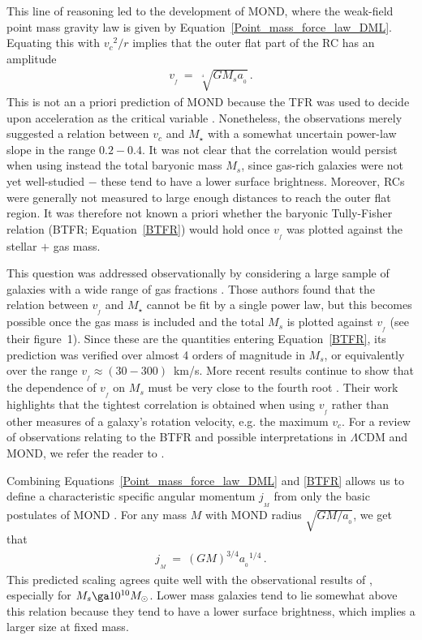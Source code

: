 \documentclass[fleqn,usenatbib,useAMS,onecolumn]{mnras} %
\begin{document}
This line of reasoning led to the development of MOND, where the weak-field point mass gravity law is given by Equation~\ref{Point_mass_force_law_DML}. Equating this with ${v_c}^2/r$ implies that the outer flat part of the RC has an amplitude
\begin{eqnarray}
	v_{_f} ~=~ \sqrt[^4]{GM_sa_{_0}} \, .
	\label{BTFR}
\end{eqnarray}
This is not an a priori prediction of MOND because the TFR was used to decide upon acceleration as the critical variable \citep{Sanders_2010, Sanders_2015}. Nonetheless, the observations merely suggested a relation between $v_c$ and $M_{\star}$ with a somewhat uncertain power-law slope in the range $0.2-0.4$. It was not clear that the correlation would persist when using instead the total baryonic mass $M_s$, since gas-rich galaxies were not yet well-studied $-$ these tend to have a lower surface brightness. Moreover, RCs were generally not measured to large enough distances to reach the outer flat region. It was therefore not known a priori whether the baryonic Tully-Fisher relation (BTFR; Equation~\ref{BTFR}) would hold once $v_{_f}$ was plotted against the stellar $+$ gas mass.

This question was addressed observationally by considering a large sample of galaxies with a wide range of gas fractions \citep{McGaugh_2000}. Those authors found that the relation between $v_{_f}$ and $M_{\star}$ cannot be fit by a single power law, but this becomes possible once the gas mass is included and the total $M_s$ is plotted against $v_{_f}$ (see their figure~1). Since these are the quantities entering Equation~\ref{BTFR}, its prediction was verified over almost 4 orders of magnitude in $M_s$, or equivalently over the range $v_{_f} \approx \left( 30 - 300 \right)$~km/s. More recent results continue to show that the dependence of $v_{_f}$ on $M_s$ must be very close to the fourth root \citep{Lelli_2019}. Their work highlights that the tightest correlation is obtained when using $v_{_f}$ rather than other measures of a galaxy's rotation velocity, e.g. the maximum $v_c$. For a review of observations relating to the BTFR and possible interpretations in $\Lambda$CDM and MOND, we refer the reader to \citet{McGaugh_2020}.

Combining Equations~\ref{Point_mass_force_law_DML} and \ref{BTFR} allows us to define a characteristic specific angular momentum $j_{_M}$ from only the basic postulates of MOND \citep{Milgrom_2021}. For any mass $M$ with MOND radius $\sqrt{GM/a_{_0}}$, we get that
\begin{eqnarray}
    j_{_M} ~=~ \left( GM \right)^{3/4} {a_{_0}}^{1/4} \, .
\end{eqnarray}
This predicted scaling agrees quite well with the observational results of \citet{Mancera_2021}, especially for $M_s \ga 10^{10} M_\odot$. Lower mass galaxies tend to lie somewhat above this relation because they tend to have a lower surface brightness, which implies a larger size at fixed mass.
\end{document}
